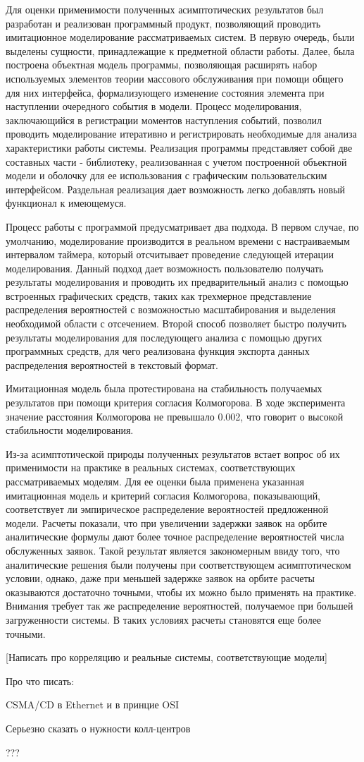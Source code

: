 Для оценки применимости полученных асимптотических результатов был разработан и реализован программный продукт, позволяющий проводить имитационное моделирование рассматриваемых систем. В первую очередь, были выделены сущности, принадлежащие к предметной области работы. Далее, была построена объектная модель программы, позволяющая расширять набор используемых элементов теории массового обслуживания при помощи общего для них интерфейса, формализующего изменение состояния элемента при наступлении очередного события в модели. Процесс моделирования, заключающийся в регистрации моментов наступления событий, позволил проводить моделирование итеративно и регистрировать необходимые для анализа характеристики работы системы. Реализация программы представляет собой две составных части - библиотеку, реализованная с учетом построенной объектной модели и оболочку для ее использования с графическим пользовательским интерфейсом. Раздельная реализация дает возможность легко добавлять новый функционал к имеющемуся.  

Процесс работы с программой предусматривает два подхода. В первом случае, по умолчанию, моделирование производится в реальном времени с настраиваемым интервалом таймера, который отсчитывает проведение следующей итерации моделирования. Данный подход дает возможность пользователю получать результаты моделирования и проводить их предварительный анализ с помощью встроенных графических средств, таких как трехмерное представление распределения вероятностей с возможностью масштабирования и выделения необходимой области с отсечением. Второй способ позволяет быстро получить результаты моделирования для последующего анализа с помощью других программных средств, для чего реализована функция экспорта данных распределения вероятностей в текстовый формат. 

Имитационная модель была протестирована на стабильность получаемых результатов при помощи критерия согласия Колмогорова. В ходе эксперимента значение расстояния Колмогорова не превышало 0.002, что говорит о высокой стабильности моделирования.

Из-за асимптотической природы полученных результатов встает вопрос об их применимости на практике в реальных системах, соответствующих рассматриваемых моделям. Для ее оценки была применена указанная имитационная модель и критерий согласия Колмогорова, показывающий, соответствует ли эмпирическое распределение вероятностей предложенной модели. Расчеты показали, что при увеличении задержки заявок на орбите аналитические формулы дают более точное распределение вероятностей числа обслуженных заявок. Такой результат является закономерным ввиду того, что аналитические решения были получены при соответствующем асимптотическом условии, однако, даже при меньшей задержке заявок на орбите расчеты оказываются достаточно точными, чтобы их можно было применять на практике. Внимания требует так же распределение вероятностей, получаемое при большей загруженности системы. В таких условиях расчеты становятся еще более точными.

[Написать про корреляцию и реальные системы, соответствующие модели]

Про что писать:

CSMA/CD в Ethernet и в принцие OSI

Серьезно сказать о нужности колл-центров

???
 \clearpage